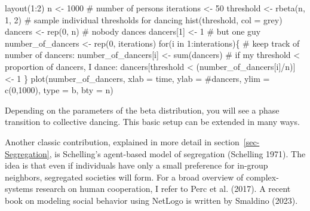 \documentclass[
  a4paper,
  DIV=11,
  numbers=noendperiod,
  oneside]{scrreprt}
\newenvironment{Shaded}{}{}
\newcommand{\AttributeTok}[1]{\textcolor[rgb]{0.84,0.23,0.29}{#1}}
\newcommand{\CommentTok}[1]{\textcolor[rgb]{0.42,0.45,0.49}{#1}}
\newcommand{\ControlFlowTok}[1]{\textcolor[rgb]{0.84,0.23,0.29}{#1}}
\newcommand{\DecValTok}[1]{\textcolor[rgb]{0.00,0.36,0.77}{#1}}
\newcommand{\FunctionTok}[1]{\textcolor[rgb]{0.44,0.26,0.76}{#1}}
\newcommand{\NormalTok}[1]{\textcolor[rgb]{0.14,0.16,0.18}{#1}}
\newcommand{\OtherTok}[1]{\textcolor[rgb]{0.44,0.26,0.76}{#1}}
\newcommand{\SpecialCharTok}[1]{\textcolor[rgb]{0.00,0.36,0.77}{#1}}
\newcommand{\StringTok}[1]{\textcolor[rgb]{0.01,0.18,0.38}{#1}}
\begin{document}
\begin{Shaded}
\begin{Highlighting}[]
\FunctionTok{layout}\NormalTok{(}\DecValTok{1}\SpecialCharTok{:}\DecValTok{2}\NormalTok{)}
\NormalTok{n }\OtherTok{\textless{}{-}} \DecValTok{1000} \CommentTok{\# number of persons}
\NormalTok{iterations }\OtherTok{\textless{}{-}} \DecValTok{50}
\NormalTok{threshold }\OtherTok{\textless{}{-}} \FunctionTok{rbeta}\NormalTok{(n, }\DecValTok{1}\NormalTok{, }\DecValTok{2}\NormalTok{) }\CommentTok{\# sample individual thresholds for dancing}
\FunctionTok{hist}\NormalTok{(threshold, }\AttributeTok{col =} \StringTok{\textquotesingle{}grey\textquotesingle{}}\NormalTok{)}
\NormalTok{dancers }\OtherTok{\textless{}{-}} \FunctionTok{rep}\NormalTok{(}\DecValTok{0}\NormalTok{, n) }\CommentTok{\# nobody dances}
\NormalTok{dancers[}\DecValTok{1}\NormalTok{] }\OtherTok{\textless{}{-}} \DecValTok{1} \CommentTok{\# but one guy}
\NormalTok{number\_of\_dancers }\OtherTok{\textless{}{-}} \FunctionTok{rep}\NormalTok{(}\DecValTok{0}\NormalTok{, iterations) }
\ControlFlowTok{for}\NormalTok{(i }\ControlFlowTok{in} \DecValTok{1}\SpecialCharTok{:}\NormalTok{interations)\{}
  \CommentTok{\# keep track of number of dancers:}
\NormalTok{  number\_of\_dancers[i] }\OtherTok{\textless{}{-}} \FunctionTok{sum}\NormalTok{(dancers) }
  \CommentTok{\# if my threshold \textless{} proportion of dancers, I dance:}
\NormalTok{  dancers[threshold }\SpecialCharTok{\textless{}}\NormalTok{ (number\_of\_dancers[i]}\SpecialCharTok{/}\NormalTok{n)] }\OtherTok{\textless{}{-}} \DecValTok{1} 
\NormalTok{\}}
\FunctionTok{plot}\NormalTok{(number\_of\_dancers, }\AttributeTok{xlab =} \StringTok{\textquotesingle{}time\textquotesingle{}}\NormalTok{, }\AttributeTok{ylab =} \StringTok{\textquotesingle{}\#dancers\textquotesingle{}}\NormalTok{,}
     \AttributeTok{ylim =} \FunctionTok{c}\NormalTok{(}\DecValTok{0}\NormalTok{,}\DecValTok{1000}\NormalTok{), }\AttributeTok{type =} \StringTok{\textquotesingle{}b\textquotesingle{}}\NormalTok{, }\AttributeTok{bty =} \StringTok{\textquotesingle{}n\textquotesingle{}}\NormalTok{)}
\end{Highlighting}
\end{Shaded}

Depending on the parameters of the beta distribution, you will see a
phase transition to collective dancing. This basic setup can be extended
in many ways.

Another classic contribution, explained in more detail in
section~\ref{sec-Segregation}, is Schelling's agent-based model of
segregation (Schelling 1971). The idea is that even if individuals have
only a small preference for in-group neighbors, segregated societies
will form. For a broad overview of complex-systems research on human
cooperation, I refer to Perc et al. (2017). A recent book on modeling
social behavior using NetLogo is written by Smaldino (2023).
\end{document}
